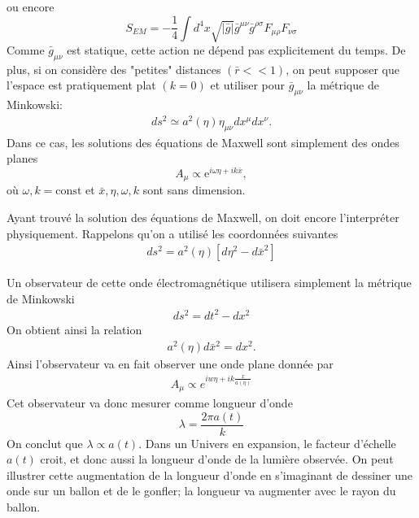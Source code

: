 \documentclass[a4paper,12pt]{report}
\theoremstyle{plain}
\theoremstyle{plain}
\begin{document}
   ou encore 
   \begin{equation}
   S_{EM} = - \frac{1}{4} \displaystyle \int d^4x \sqrt{|\bar{g}|} \bar{g}^{\mu \nu } \bar{g}^{\rho \sigma } F_{\mu \rho } F_{\nu \sigma } 
   \end{equation}
   Comme $\bar{g}_{\mu \nu }$ est statique, cette action ne d\'epend pas explicitement du temps. De plus, si on consid\`ere des "petites" distances $(\bar{r}<<1)$, on peut supposer que l'espace est pratiquement plat $(k=0)$ et utiliser pour $\bar{g}_{\mu \nu }$ la m\'etrique de Minkowski: 
   \begin{eqnarray}
   ds^2 \simeq a^2 ( \eta) \eta_{\mu \nu } dx^\mu dx^\nu.
   \end{eqnarray}
   Dans ce cas, les solutions des \'equations de Maxwell sont simplement des ondes planes 
   \begin{equation}
   A_\mu \propto \mathrm{e}^{i \omega \eta +ik \bar{x}},
   \end{equation} 
   o\`{u} $\omega , k = \text{const} $ et $ \bar{x}, \eta , \omega , k $ sont sans dimension. 
   
   Ayant trouv\'e la solution des \'equations de Maxwell, on doit encore l'interpr\'eter physiquement. Rappelons qu'on a utilis\'e les coordonn\'ees suivantes 
   \begin{eqnarray}
   ds^2 =a^2(\eta ) \left[ d \eta ^2 -d\bar{x}^2 \right]   
   \end{eqnarray}
   
      	Un observateur de cette onde \'electromagn\'etique utilisera simplement la m\'etrique de Minkowski
      	\begin{eqnarray}
      	ds^2=dt^2-dx^2
      	\end{eqnarray}
      	On obtient ainsi la relation 
      	\begin{eqnarray}
      	a^2\left(\eta \right)d\bar{x}^2=dx^2. 
      	\end{eqnarray}
      	Ainsi l'observateur va en fait observer une onde plane donn\'ee par
      	\begin{eqnarray}
      	A_\mu \propto e^{iw\eta +ik\frac{x}{a\left(\eta \right) }}
      	\end{eqnarray}
      	Cet observateur va donc mesurer comme longueur d'onde 
      	\begin{equation}
      	\lambda = \frac{2\pi a\left(t \right) }{k}
      	\end{equation}
      	On conclut que $\lambda\propto a\left( t \right) $. Dans un Univers en expansion, le facteur d'\'echelle $a \left(t \right)$ croit, et donc aussi la longueur d'onde de la lumi\`ere observ\'ee. On peut illustrer cette augmentation de la longueur d'onde en s'imaginant de dessiner une onde sur un ballon et de le gonfler; la longueur va augmenter  avec le rayon du ballon.	
      	
\end{document}
